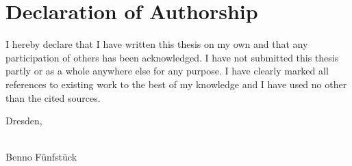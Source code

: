 \chapter*{Declaration of Authorship}

\begingroup%
\narrower%
\narrower%
\noindent\Large
I hereby declare that I have written this thesis on my own and that any participation of others has been acknowledged.
I have not submitted this thesis partly or as a whole anywhere else for any purpose.
I have clearly marked all references to existing work to the best of my knowledge and I have used no other than the cited sources.
\normalsize

\vspace{1.5cm}

\noindent
\makeatletter
Dresden, \@date \hfill \begin{minipage}[t]{10em}{\vspace{1ex}\hrulefill\\\mbox{}\hfill{}Benno Fünfstück\hfill{}\mbox{}}\end{minipage}
\makeatother
\endgroup



